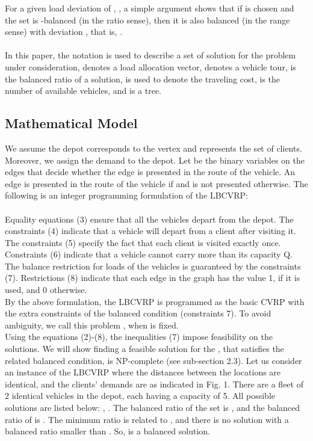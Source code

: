  \indent For a given load deviation of ,  , a simple argument shows that if   is chosen and the set   is -balanced (in the ratio sense), then it is also balanced (in the range sense) with deviation , that is, . \\
 \\
 \indent In this paper, the notation  is used to describe a set of solution for the problem under consideration,  denotes a load allocation vector,  denotes a vehicle tour,  is the balanced ratio of a solution,  is used to denote the traveling cost,  is the number of available vehicles, and  is a tree.
\subsection {Mathematical Model}
\indent We assume the depot corresponds to the vertex  and  represents the set of clients. Moreover, we assign the demand  to the depot. Let  be the binary variables on the edges  that decide whether the edge  is presented in the route of the  vehicle. An edge  is presented in the route of the  vehicle if  and is not presented otherwise. The following is an integer programming formulation of the LBCVRP:\\
\\
\indent  Equality equations (3) ensure that all the vehicles depart from the depot. The constraints (4) indicate that a vehicle will depart from a client after visiting it. The constraints (5) specify the fact that each client is visited exactly once. Constraints (6) indicate that a vehicle cannot carry more than its capacity Q. The balance restriction for loads of the vehicles is guaranteed by the constraints (7). Restrictions (8) indicate that each edge in the graph has the value 1, if it is used, and 0 otherwise. \\
\indent  By the above formulation, the LBCVRP is programmed as the basic CVRP with the extra constraints of the balanced condition (constraints 7). To avoid ambiguity, we call this problem , when  is fixed. \\
\indent Using the equations (2)-(8), the inequalities (7) impose feasibility on the solutions. We will show finding a feasible solution for the , that satisfies the related balanced condition, is NP-complete (see sub-section 2.3). Let us consider an instance  of the LBCVRP where the distances between the locations are identical, and the clients' demands are as indicated in Fig. 1. There are a fleet of 2 identical vehicles in the depot, each having a capacity of 5. All possible solutions are listed below: , . The balanced ratio of the set  is , and the balanced ratio of  is . The minimum ratio is related to , and there is no solution with a balanced ratio smaller than . So,  is a balanced solution. \\
